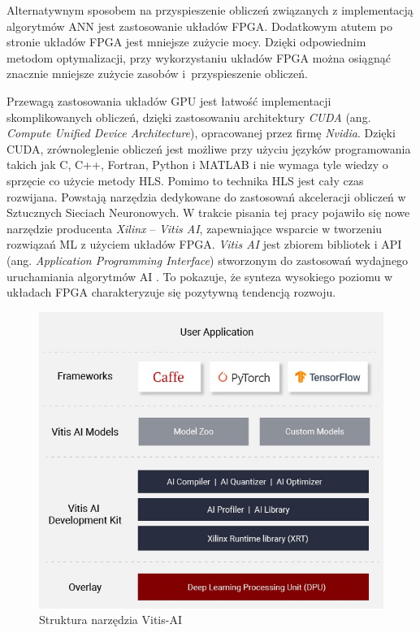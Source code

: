 Alternatywnym sposobem na przyspieszenie obliczeń związanych z implementacją algorytmów ANN jest zastosowanie układów FPGA. Dodatkowym atutem po stronie układów FPGA jest mniejsze zużycie mocy. Dzięki odpowiednim metodom optymalizacji, przy wykorzystaniu układów FPGA można osiągnąć znacznie mniejsze zużycie zasobów i~przyspieszenie obliczeń.

Przewagą zastosowania układów GPU jest łatwość implementacji skomplikowanych obliczeń, dzięki zastosowaniu architektury \emph
{CUDA} (ang. \emph{Compute Unified Device Architecture}), opracowanej przez firmę \emph{Nvidia}. Dzięki CUDA, zrównoleglenie obliczeń jest możliwe przy użyciu języków programowania takich jak C, C++, Fortran, Python i MATLAB \cite{cuda} i nie wymaga tyle wiedzy o sprzęcie co użycie metody HLS. Pomimo to technika HLS jest cały czas rozwijana. Powstają narzędzia dedykowane do zastosowań akceleracji obliczeń w Sztucznych Sieciach Neuronowych. W trakcie pisania tej pracy pojawiło się nowe narzędzie producenta \emph{Xilinx} -- \emph{Vitis AI}, zapewniające wsparcie w tworzeniu rozwiązań ML z użyciem układów FPGA. \emph{Vitis AI} jest zbiorem bibliotek i API (ang. \emph{Application Programming Interface}) stworzonym do zastosowań wydajnego uruchamiania algorytmów AI \cite{vitis-ai}. To pokazuje, że synteza wysokiego poziomu w układach FPGA charakteryzuje się pozytywną tendencją rozwoju.

\begin{figure}[h]
    \centering
    \includegraphics[width=\textwidth]{img/vitis-AI.jpg}
    \caption{Struktura narzędzia Vitis-AI \cite{vitis-AI-obraz}}
    \label{vitisAI}
  \end{figure}

